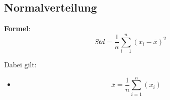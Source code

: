 \subsection{Normalverteilung}

\textbf{Formel}:
\[
    Std =   \frac{1}{n}\sum_{i=1}^{n}(x_i - \overline{x})^2
\]

Dabei gilt:
\begin{itemize}
    \item \[
            \overline{x} = \frac{1}{n}\sum_{i=1}^{n}(x_i)
        \]
\end{itemize}


